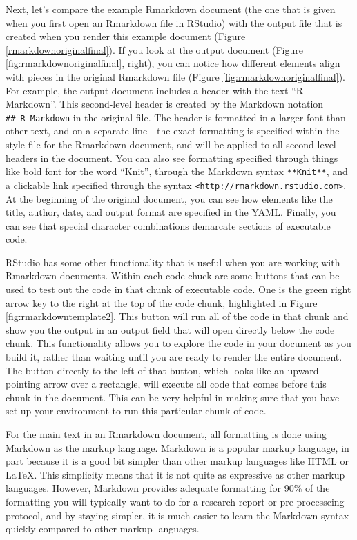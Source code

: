 \documentclass[]{tufte-book}
\begin{document}
Next, let's compare the example Rmarkdown document (the one that is given when
you first open an Rmarkdown file in RStudio) with the output file that is
created when you render this example document (Figure
\ref{rmarkdownoriginalfinal}). If you look at the output document (Figure
\ref{fig:rmarkdownoriginalfinal}, right), you can notice how different elements
align with pieces in the original Rmarkdown file (Figure
\ref{fig:rmarkdownoriginalfinal}). For example, the output document includes a
header with the text ``R Markdown''. This second-level header is created by the
Markdown notation \texttt{\#\#\ R\ Markdown} in the original file. The header is formatted
in a larger font than other text, and on a separate line---the exact formatting
is specified within the style file for the Rmarkdown document, and will be
applied to all second-level headers in the document. You can also see formatting
specified through things like bold font for the word ``Knit'', through the
Markdown syntax \texttt{**Knit**}, and a clickable link specified through the syntax
\texttt{\textless{}http://rmarkdown.rstudio.com\textgreater{}}. At the beginning of the original document, you
can see how elements like the title, author, date, and output format are
specified in the YAML. Finally, you can see that special character combinations
demarcate sections of executable code.

RStudio has some other functionality that is useful when you are working with
Rmarkdown documents. Within each code chuck are some buttons that can be used to
test out the code in that chunk of executable code. One is the green right arrow
key to the right at the top of the code chunk, highlighted in Figure
\ref{fig:rmarkdowntemplate2}. This button will run all of the code in that
chunk and show you the output in an output field that will open directly below
the code chunk. This functionality allows you to explore the code in your
document as you build it, rather than waiting until you are ready to render the
entire document. The button directly to the left of that button, which looks
like an upward-pointing arrow over a rectangle, will execute all code that comes
before this chunk in the document. This can be very helpful in making sure that
you have set up your environment to run this particular chunk of code.

For the main text in an Rmarkdown document, all formatting is done using
Markdown as the markup language. Markdown is a popular markup language, in part
because it is a good bit simpler than other markup languages like HTML or LaTeX.
This simplicity means that it is not quite as expressive as other markup
languages. However, Markdown provides adequate formatting for 90\% of the
formatting you will typically want to do for a research report or
pre-processeing protocol, and by staying simpler, it is much easier to learn the
Markdown syntax quickly compared to other markup languages.
\end{document}
